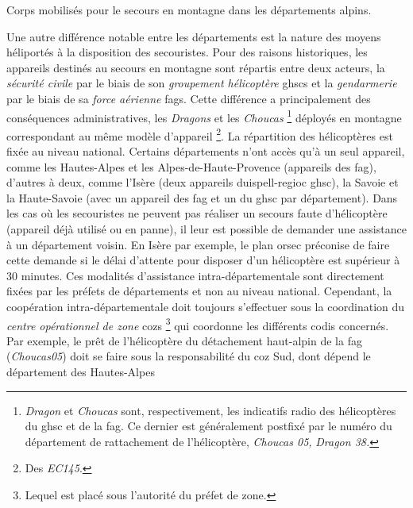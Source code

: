 \begin{table}
  \centering
  
  \caption{Corps mobilisés pour le secours en montagne dans les
    départements alpins.}
  \label{tab:organisation_secours_departements}
\end{table}

Une autre différence notable entre les départements est la nature des
moyens héliportés à la disposition des secouristes. Pour des raisons
historiques, les appareils destinés au secours en montagne sont
répartis entre deux acteurs, la \emph{sécurité civile} par le biais de
son \emph{groupement hélicoptère} \acp{ghsc} et la \emph{gendarmerie}
par le biais de sa \emph{force aérienne} \acp{fag}. Cette différence a
principalement des conséquences administratives, les \emph{Dragons} et
les \emph{Choucas} \footnote{\emph{Dragon} et \emph{Choucas} sont,
  respectivement, les indicatifs radio des hélicoptères du \ac{ghsc}
  et de la \ac{fag}. Ce dernier est généralement postfixé par le
  numéro du département de rattachement de l'hélicoptère, \eg
  \emph{Choucas 05,} \emph{Dragon 38.}} déployés en montagne
correspondant au même modèle d'appareil \footnote{Des
  \emph{EC145}.}. La répartition des hélicoptères est fixée au niveau
national. Certains départements n'ont accès qu'à un seul appareil,
comme les Hautes-Alpes et les Alpes-de-Haute-Provence (appareils des
\ac{fag}), d'autres à deux, comme l'Isère (deux appareils
duispell-regioc \ac{ghsc}), la Savoie et la Haute-Savoie (avec un
appareil des \ac{fag} et un du \ac{ghsc} par département). Dans les
cas où les secouristes ne peuvent pas réaliser un secours faute
d'hélicoptère (appareil déjà utilisé ou en panne), il leur est
possible de demander une assistance à un département voisin. En Isère
par exemple, le plan \ac{orsec} préconise de faire cette demande si le
délai d'attente pour disposer d'un hélicoptère est supérieur à 30
minutes.
Ces modalités d'assistance intra-départementale sont directement
fixées par les préfets de départements et non au niveau
national. Cependant, la coopération intra-départementale doit toujours
s'effectuer sous la coordination du \emph{centre opérationnel de zone}
\acp{coz} \footnote{Lequel est placé sous l'autorité du préfet de
  zone.} qui coordonne les différents \ac{codis} concernés. Par
exemple, le prêt de l'hélicoptère du détachement haut-alpin de la
\ac{fag} (\emph{Choucas05}) doit se faire sous la responsabilité du
\ac{coz} Sud, dont dépend le département des Hautes-Alpes

